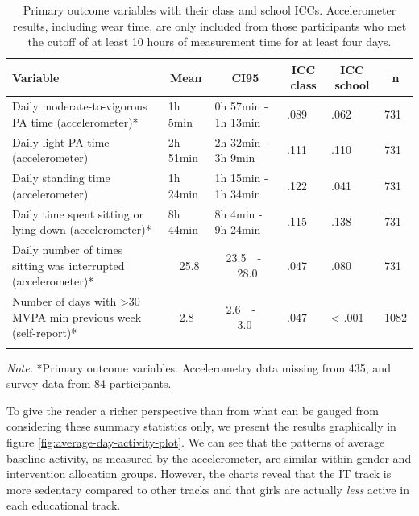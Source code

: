\documentclass[english,man,floatsintext]{apa6}
\begin{document}
\begin{table}[tbp]
\begin{center}
\begin{threeparttable}
\caption{\label{tab:primary-outcome-vars-table-total}Primary outcome variables with their class and school ICCs. Accelerometer results, including wear time, are only included from those participants who met the cutoff of at least 10 hours of measurement time for at least four days.}
\begin{tabular}{llllll}
\toprule
Variable & \multicolumn{1}{c}{Mean} & \multicolumn{1}{c}{CI95} & \multicolumn{1}{c}{ICC class} & \multicolumn{1}{c}{ICC school} & \multicolumn{1}{c}{n}\\
\midrule
Daily moderate-to-vigorous PA time (accelerometer)* & 1h 5min & 0h 57min - 1h 13min & .089 & .062 & 731\\
Daily light PA time (accelerometer) & 2h 51min & 2h 32min - 3h 9min & .111 & .110 & 731\\
Daily standing time (accelerometer) & 1h 24min & 1h 15min - 1h 34min & .122 & .041 & 731\\
Daily time spent sitting or lying down (accelerometer)* & 8h 44min & 8h 4min - 9h 24min & .115 & .138 & 731\\
Daily number of times sitting was interrupted (accelerometer)* & \ \ 25.8 & \ \ 23.5\ \ -\ \ \ \ 28.0 & .047 & .080 & 731\\
Number of days with >30 MVPA min previous week (self-report)* & \ \  2.8 & \ \  2.6\ \ -\ \ \ \  3.0 & .047 & < .001 & 1082\\
\bottomrule
\addlinespace
\end{tabular}
\begin{tablenotes}[para]
\normalsize{\textit{Note.} *Primary outcome variables. Accelerometry data missing from 435, and survey data from 84 participants.}
\end{tablenotes}
\end{threeparttable}
\end{center}
\end{table}

To give the reader a richer perspective than from what can be gauged from considering these summary statistics only, we present the results graphically in figure \ref{fig:average-day-activity-plot}. We can see that the patterns of average baseline activity, as measured by the accelerometer, are similar within gender and intervention allocation groups. However, the charts reveal that the IT track is more sedentary compared to other tracks and that girls are actually \emph{less} active in each educational track.
\end{document}
